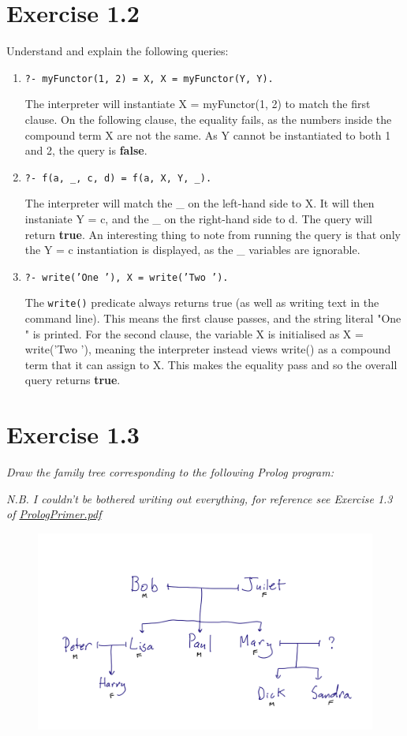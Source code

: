 \documentclass{report}
\newcommand{\code}[1]{\texttt{#1}}
\begin{document}
\section{\textbf{Exercise 1.2}}
Understand and explain the following queries:
\begin{enumerate}[label=(\alph*)]

    \item \code{?- myFunctor(1, 2) = X, X = myFunctor(Y, Y).}
    
    The interpreter will instantiate X = myFunctor(1, 2) to match the first clause. On the following clause, the equality fails, as the numbers inside the compound term X are not the same. As Y cannot be instantiated to both 1 and 2, the query is \textbf{false}.

    \item \code{?- f(a, \_, c, d) = f(a, X, Y, \_).}
    
    The interpreter will match the \_ on the left-hand side to X. It will then instaniate Y = c, and the \_ on the right-hand side to d. The query will return \textbf{true}. An interesting thing to note from running the query is that only the Y = c instantiation is displayed, as the \_ variables are ignorable.

    \item \code{?- write('One '), X = write('Two ').}
    
    The \code{write()} predicate always returns true (as well as writing text in the command line). This means the first clause passes, and the string literal "One " is printed. For the second clause, the variable X is initialised as X = write('Two '), meaning the interpreter instead views write() as a compound term that it can assign to X. This makes the equality pass and so the overall query returns \textbf{true}.

\end{enumerate}

\section{\textbf{Exercise 1.3}}
\emph{Draw the family tree corresponding to the following Prolog program:}

\noindent\emph{N.B. I couldn't be bothered writing out everything, for reference see Exercise 1.3 of \href{run:./PrologPrimer.pdf}{PrologPrimer.pdf}}

\begin{figure}[h]
    \centering
    \includegraphics[width=1\textwidth]{Family_Tree.png}
    \label{fig:Family_Tree}
\end{figure}
\end{document}
